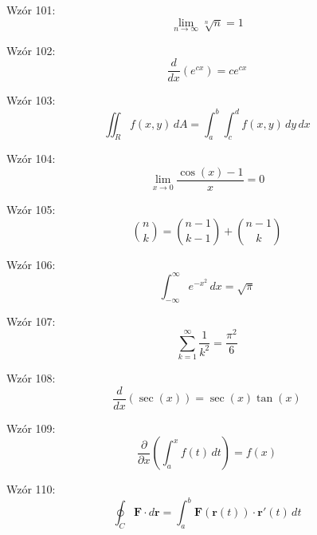 \documentclass{article}
\begin{document}
Wzór 101:
\[ \lim_{{n \to \infty}} \sqrt[n]{n} = 1 \]

Wzór 102:
\[ \frac{d}{dx}\left(e^{cx}\right) = c e^{cx} \]

Wzór 103:
\[ \iint_R f(x,y) \,dA = \int_{a}^{b} \int_{c}^{d} f(x,y) \,dy\,dx \]

Wzór 104:
\[ \lim_{{x \to 0}} \frac{\cos(x) - 1}{x} = 0 \]

Wzór 105:
\[ \binom{n}{k} = \binom{n-1}{k-1} + \binom{n-1}{k} \]

Wzór 106:
\[ \int_{-\infty}^{\infty} e^{-x^2} \,dx = \sqrt{\pi} \]

Wzór 107:
\[ \sum_{k=1}^{\infty} \frac{1}{k^2} = \frac{\pi^2}{6} \]

Wzór 108:
\[ \frac{d}{dx}\left(\sec(x)\right) = \sec(x) \tan(x) \]

Wzór 109:
\[ \frac{\partial}{\partial x}\left(\int_{a}^{x} f(t) \,dt\right) = f(x) \]

Wzór 110:
\[ \oint_C \mathbf{F} \cdot d\mathbf{r} = \int_{a}^{b} \mathbf{F}(\mathbf{r}(t)) \cdot \mathbf{r}'(t) \,dt \]
\end{document}
